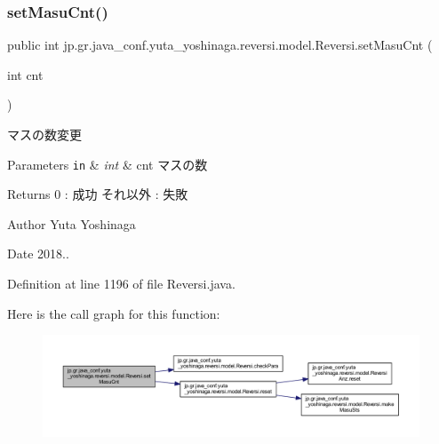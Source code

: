 \subsubsection{\texorpdfstring{set\+Masu\+Cnt()}{setMasuCnt()}}
{\footnotesize\ttfamily public int jp.\+gr.\+java\+\_\+conf.\+yuta\+\_\+yoshinaga.\+reversi.\+model.\+Reversi.\+set\+Masu\+Cnt (\begin{DoxyParamCaption}\item[{int}]{cnt }\end{DoxyParamCaption})}



マスの数変更 


\begin{DoxyParams}[1]{Parameters}
\mbox{\tt in}  & {\em int} & cnt マスの数 \\
\hline
\end{DoxyParams}
\begin{DoxyReturn}{Returns}
0 \+: 成功 それ以外 \+: 失敗 
\end{DoxyReturn}
\begin{DoxyAuthor}{Author}
Yuta Yoshinaga 
\end{DoxyAuthor}
\begin{DoxyDate}{Date}
2018.. 
\end{DoxyDate}


Definition at line 1196 of file Reversi.\+java.

Here is the call graph for this function\+:\nopagebreak
\begin{figure}[H]
\begin{center}
\leavevmode
\includegraphics[width=350pt]{classjp_1_1gr_1_1java__conf_1_1yuta__yoshinaga_1_1reversi_1_1model_1_1_reversi_a0e9bc15d570635cf024287fbf541b4b9_cgraph}
\end{center}
\end{figure}
\mbox{\label{classjp_1_1gr_1_1java__conf_1_1yuta__yoshinaga_1_1reversi_1_1model_1_1_reversi_a7abf9238b933653eec2908f6e1a863db}} 
